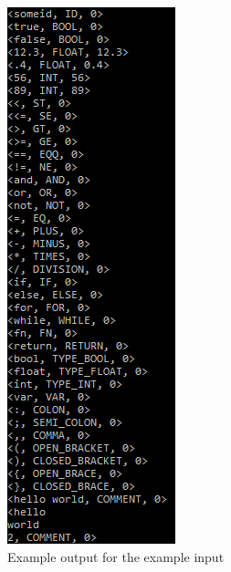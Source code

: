 \begin{figure}[H]
	\centering
	\includegraphics[scale=1]{Images/Q1_ExampleTest.png}
	\caption{Example output for the example input}
\end{figure}


